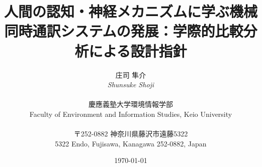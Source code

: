 \title{人間の認知・神経メカニズムに学ぶ機械同時通訳システムの発展：学際的比較分析による設計指針}

\author{
  庄司 隼介\\
  \textit{Shunsuke Shoji}\\
  \\
  慶應義塾大学環境情報学部\\
  Faculty of Environment and Information Studies, Keio University\\
  \\
  〒252-0882 神奈川県藤沢市遠藤5322\\
  5322 Endo, Fujisawa, Kanagawa 252-0882, Japan
}

\date{\today}
